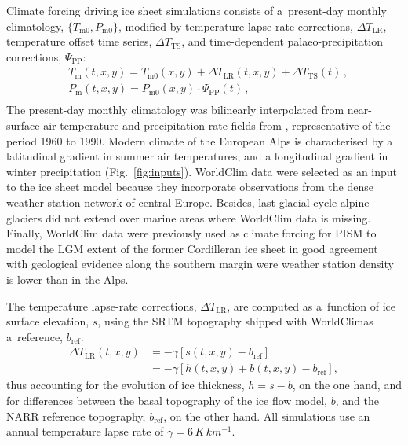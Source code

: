 \documentclass[tc, manuscript]{copernicus}
\begin{document}
    Climate forcing driving ice sheet simulations consists of a~present-day
    monthly climatology, $\{T_{\mathrm{m}0}, P_{\mathrm{m}0}\}$, modified by
    temperature lapse-rate corrections, ${\Delta}T_{\text{LR}}$, temperature
    offset time series, ${\Delta}T_{\text{TS}}$, and time-dependent
    palaeo-precipitation corrections, $\Psi_{\text{PP}}$:
    \begin{align}
      &T_{\mathrm{m}}(t, x, y) = T_{\mathrm{m}0}(x, y) +
                                 {\Delta}T_{\text{LR}}(t, x, y) +
                                 {\Delta}T_{\text{TS}}(t) \,, \\
      &P_{\mathrm{m}}(t, x, y) = P_{\mathrm{m}0}(x, y) \cdot
                                 {\Psi}_{\text{PP}}(t) \,, \\
    \end{align}
    The present-day monthly climatology was bilinearly interpolated from
    near-surface air temperature and precipitation rate fields from
    \citep[WorldClim;][]{Hijmans.etal.2005}, representative of the period 1960
    to 1990. Modern climate of the European Alps is characterised by a
    latitudinal gradient in summer air temperatures, and a longitudinal
    gradient in winter precipitation (Fig.~\ref{fig:inputs}). WorldClim data
    were selected as an input to the ice sheet model because they incorporate
    observations from the dense weather station network of central Europe.
    Besides, last glacial cycle alpine glaciers did not extend over marine
    areas where WorldClim data is missing. Finally, WorldClim data were
    previously used as climate forcing for PISM to model the LGM extent of the
    former Cordilleran ice sheet in good agreement with geological evidence
    along the southern margin \citep{Seguinot.etal.2014} were weather station
    density is lower than in the Alps.

    The temperature lapse-rate corrections, ${\Delta}T_{\text{LR}}$, are
    computed as a~function of ice surface elevation, $s$, using the SRTM
    topography shipped with WorldClimas a~reference, $b_{\text{ref}}$:
    \begin{align}
      {\Delta}T_{\text{LR}}(t, x, y) &= -\gamma [s(t, x, y)-b_{\text{ref}}] \\
                                     &= -\gamma [h(t, x, y)+
                                                 b(t, x, y)-b_{\text{ref}}],
    \end{align}
    thus accounting for the evolution of ice thickness, ${h=s-b}$, on the one
    hand, and for differences between the basal topography of the ice flow
    model, $b$, and the NARR reference topography, $b_{\text{ref}}$, on the
    other hand. All simulations use an annual temperature lapse rate of
    $\gamma=6\,\unit{K\,km^{-1}}$.
\end{document}
